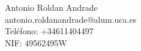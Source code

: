 Antonio Roldan Andrade \\ %
antonio.roldanandrade@alum.uca.es \\ %
Teléfono: +34611404497 \\ %
NIF: 49562495W \\ %
